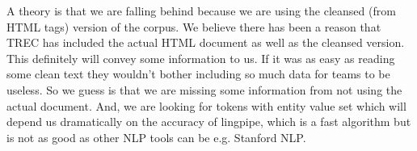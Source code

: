 A theory is that we are falling behind because we are using the cleansed (from HTML tags)
version of the corpus. We believe there has been a reason that TREC has 
included the actual HTML document as well as the cleansed version. This 
definitely will convey some information to us. If it was as easy as reading 
some clean text they wouldn't bother including so much data for teams to be 
useless. So we guess is that we are missing some information from not using 
the actual document. And, we are looking for tokens with entity value set 
which will depend us dramatically on the accuracy of lingpipe, which is a fast 
algorithm but is not as good as other NLP tools can be e.g. Stanford NLP.


